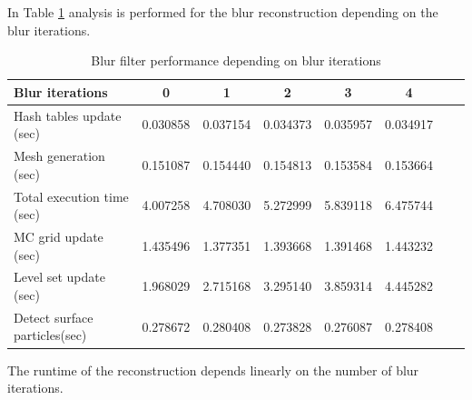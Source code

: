 In Table \ref{tab:bi_perf_analysis} analysis is performed for the blur reconstruction depending on the blur iterations. 
\begin{table}[H]
	\begin{center}
		\scriptsize
		\begin{tabular}{|l|c|c|c|c|c|c|c|}
			\hline
			Blur iterations & 0 & 1 & 2 & 3 & 4 \\
			\hline
			Hash tables update (sec)		&	0.030858	&	0.037154	&	0.034373	&	0.035957	&	0.034917\\
			Mesh generation	(sec)			&	0.151087	&	0.154440	&	0.154813	&	 0.153584	&	0.153664\\
			Total execution time (sec)		&	4.007258	&	4.708030	&	5.272999	&	5.839118	&	6.475744\\
			MC grid update (sec)			&	1.435496	&	1.377351	&	1.393668	&	1.391468	&	1.443232\\
			Level set update (sec)			&	1.968029	&	2.715168	&	3.295140	&	3.859314	&	4.445282\\
			Detect surface particles(sec)	&	0.278672	&	0.280408	&	0.273828	&	0.276087	&	0.278408\\
			\hline
		\end{tabular}
	\end{center}
	\caption{Blur filter performance depending on blur iterations}
	\label{tab:bi_perf_analysis}
\end{table}
The runtime of the reconstruction depends linearly on the number of blur iterations.\\

